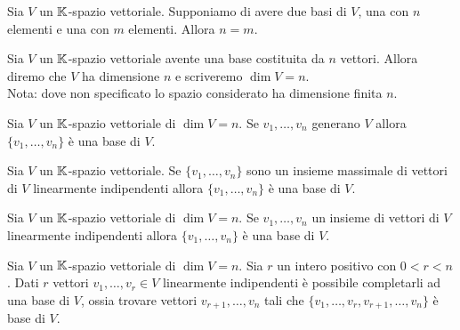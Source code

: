 \begin{corollary}
	Sia $ V $ un $ \mathbb{K} $-spazio vettoriale. Supponiamo di avere due basi di $ V $, una con $ n $ elementi e una con $ m $ elementi. Allora $ n = m $.
\end{corollary}

\begin{definition}[dimensione]
	Sia $ V $ un $ \mathbb{K} $-spazio vettoriale avente una base costituita da $ n $ vettori. Allora diremo che $ V $ ha dimensione $ n $ e scriveremo $ \dim{V} = n $. \\ 
	\textsf{Nota: dove non specificato lo spazio considerato ha dimensione finita $ n $.}
\end{definition}

\begin{thm}
	Sia $ V $ un $ \mathbb{K} $-spazio vettoriale di $ \dim{V} = n $. Se $ v_1, \ldots, v_n $ generano $ V $ allora $ \{v_1, \ldots, v_n\} $ è una base di $ V $.
\end{thm}

\begin{thm}
	Sia $ V $ un $ \mathbb{K} $-spazio vettoriale. Se $ \{v_1, \ldots, v_n\} $ sono un insieme massimale di vettori di $ V $ linearmente indipendenti allora $ \{v_1, \ldots, v_n\} $ è una base di $ V $. 
\end{thm}

\begin{thm}
	Sia $ V $ un $ \mathbb{K} $-spazio vettoriale di $ \dim{V} = n $. Se $ v_1, \ldots, v_n $ un insieme di vettori di $ V $ linearmente indipendenti allora $ \{v_1, \ldots, v_n\} $ è una base di $ V $.
\end{thm}

\begin{thm}
	Sia $ V $ un $ \mathbb{K} $-spazio vettoriale di $ \dim{V} = n $. Sia $ r $ un intero positivo con $ 0 < r < n $. Dati $ r $ vettori $ v_1, \ldots , v_r \in V $ linearmente indipendenti è possibile completarli ad una base di $ V $, ossia trovare vettori $ v_{r+1}, \ldots, v_n $ tali che $ \{v_1, \ldots , v_r, v_{r+1}, \ldots , v_n\} $ è base di $ V $.
\end{thm}